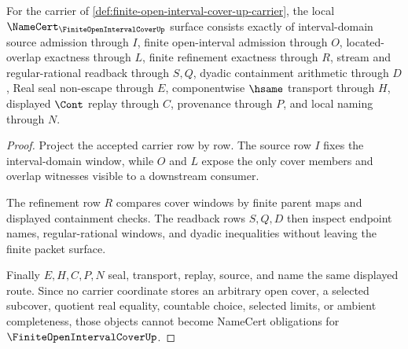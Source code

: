 \begin{theorem}
\label{thm:finite-open-interval-cover-up-namecert-obligations}
For the carrier of \autoref{def:finite-open-interval-cover-up-carrier}, the local $\NameCert_{\FiniteOpenIntervalCoverUp}$ surface consists exactly of interval-domain source admission through $I$, finite open-interval admission through $O$, located-overlap exactness through $L$, finite refinement exactness through $R$, stream and regular-rational readback through $S,Q$, dyadic containment arithmetic through $D$, Real seal non-escape through $E$, componentwise $\hsame$ transport through $H$, displayed $\Cont$ replay through $C$, provenance through $P$, and local naming through $N$.
\end{theorem}
\begin{proof}
Project the accepted carrier row by row. The source row $I$ fixes the interval-domain window, while $O$ and $L$ expose the only cover members and overlap witnesses visible to a downstream consumer.

The refinement row $R$ compares cover windows by finite parent maps and displayed containment checks. The readback rows $S,Q,D$ then inspect endpoint names, regular-rational windows, and dyadic inequalities without leaving the finite packet surface.

Finally $E,H,C,P,N$ seal, transport, replay, source, and name the same displayed route. Since no carrier coordinate stores an arbitrary open cover, a selected subcover, quotient real equality, countable choice, selected limits, or ambient completeness, those objects cannot become NameCert obligations for $\FiniteOpenIntervalCoverUp$.
\end{proof}


